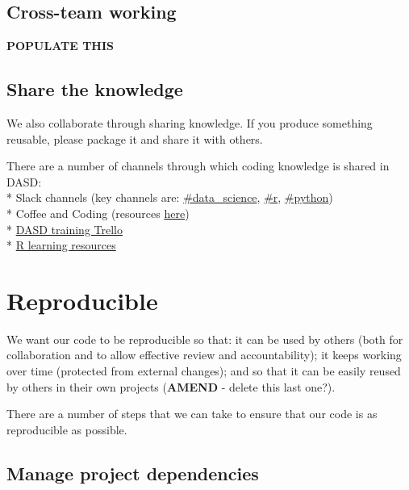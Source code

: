 \documentclass[]{book}
\begin{document}
\hypertarget{crossteamworking}{%
\section{Cross-team working}\label{crossteamworking}}

\textbf{POPULATE THIS}

\hypertarget{knowledge}{%
\section{Share the knowledge}\label{knowledge}}

We also collaborate through sharing knowledge. If you produce something reusable, please package it and share it with others.

There are a number of channels through which coding knowledge is shared in DASD:\\
* Slack channels (key channels are: \href{https://app.slack.com/client/T1PU1AP6D/C1Z8Q18LS}{\#data\_science}, \href{https://app.slack.com/client/T1PU1AP6D/C1PUCG719}{\#r}, \href{https://app.slack.com/client/T1PU1AP6D/C1Q09V86S}{\#python})\\
* Coffee and Coding (resources \href{https://github.com/moj-analytical-services/Coffee-and-Coding}{here})\\
* \href{https://trello.com/b/zAwm6sCc/dasd-training}{DASD training Trello}\\
* \href{https://docs.google.com/document/d/1R4hBMf26T9HEnCdVz56PpZhwiCv5RhberYL3BxOSKsA/edit}{R learning resources}

\hypertarget{reproduce}{%
\chapter{Reproducible}\label{reproduce}}

We want our code to be reproducible so that: it can be used by others (both for collaboration and to allow effective review and accountability); it keeps working over time (protected from external changes); and so that it can be easily reused by others in their own projects (\textbf{AMEND} - delete this last one?).

There are a number of steps that we can take to ensure that our code is as reproducible as possible.

\hypertarget{projdep}{%
\section{Manage project dependencies}\label{projdep}}
\end{document}
